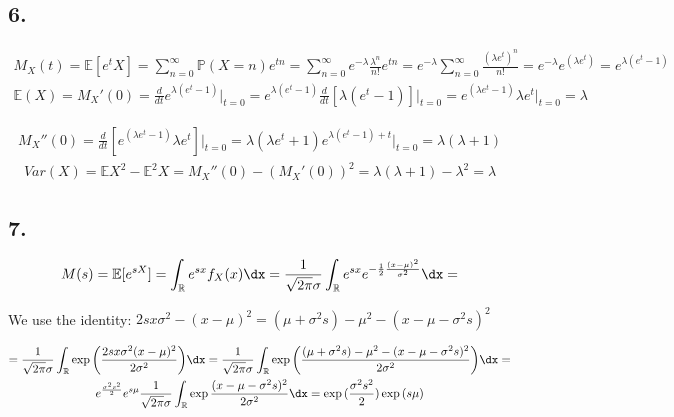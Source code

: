 \subsection*{6.}

\begin{align*} 
M_X(t)=\mathbb{E}[e^tX]=\sum_{n=0}^{\infty}\mathbb{P}(X=n)e^{tn}=\sum_{n=0}^{\infty}e^{-\lambda}\frac{\lambda^n}{n!}e^{tn}=e^{-\lambda}\sum_{n=0}^{\infty}\frac{(\lambda e^t)^n}{n!}=e^{-\lambda}e^{(\lambda e^t)}=e^{\lambda(e^t-1)}
\end{align*}
\begin{align*}
    \mathbb{E}(X)=M_X'(0)=\frac{d}{dt}e^{\lambda(e^t-1)}\bigg\rvert_{t=0}=e^{\lambda(e^t-1)}\frac{d}{dt}[\lambda (e^{t}-1)]\bigg\rvert_{t=0}= e^{(\lambda e^t-1)}\lambda e^t \bigg\rvert_{t=0}= \lambda
\end{align*}

\begin{align*}
    M_X''(0)=\frac{d}{dt}[e^{(\lambda e^t-1)}\lambda e^t] \bigg\rvert_{t=0}=\lambda(\lambda e^t+1)e^{\lambda(e^t-1)+t}\bigg\rvert_{t=0}= \lambda (\lambda+1)
\end{align*}
\begin{align*}
    Var(X)=\mathbb{E}X^2-\mathbb{E}^2X=M_X''(0)-(M_X'(0))^2=\lambda(\lambda+1)-\lambda^2=\lambda
\end{align*}

\subsection*{7.}
 \begin{align*}
 M(s)=\mathbb{E}[e^{sX}]=\int_{\mathbb{R}}e^{sx} f_X(x)\dx = \frac{1}{\sqrt{2\pi}\sigma}\int_{\mathbb{R}}e^{sx} e^{-\frac{1}{2}\frac{(x-\mu)^2}{\sigma^2}}\dx =
 \end{align*}
 
 We use the identity: $2sx\sigma^2-(x-\mu)^2=(\mu+\sigma^2 s)-\mu^2-(x-\mu-\sigma^2s)^2$
 
 \begin{gather*}
     =\frac{1}{\sqrt{2\pi}\sigma}\int_{\mathbb{R}} \exp{\left(\frac{2sx\sigma^2(x-\mu)^2}{2\sigma^2}\right)}\dx=\frac{1}{\sqrt{2\pi}\sigma}\int_{\mathbb{R}} \exp{\left(\frac{(\mu+\sigma^2 s)-\mu^2-(x-\mu-\sigma^2s)^2}{2\sigma^2}\right)}\dx = \\
     e^{\frac{\sigma^2s^2}{2}}e^{s\mu}\frac{1}{\sqrt{2\pi}\sigma}\int_{\mathbb{R}} \exp{\frac{(x-\mu-\sigma^2s)^2}{2\sigma^2}}\dx = \exp{(\frac{\sigma^2s^2}{2})}\exp{(s\mu)}
 \end{gather*}
 
